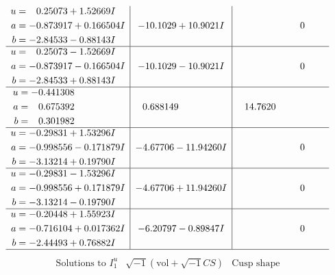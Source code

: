 \documentclass[1p]{elsarticle_modified}
\theoremstyle{definition}
\newcommand{\I}{\sqrt{-1}}
\begin{document}
$$\begin{array}{c|c|c}
\begin{aligned}
u &= \phantom{-}0.25073 + 1.52669 I \\
a &= -0.873917 + 0.166504 I \\
b &= -2.84533 - 0.88143 I\end{aligned}
 & -10.1029 + 10.9021 I & \phantom{-0.000000 } 0 \\ \hline\begin{aligned}
u &= \phantom{-}0.25073 - 1.52669 I \\
a &= -0.873917 - 0.166504 I \\
b &= -2.84533 + 0.88143 I\end{aligned}
 & -10.1029 - 10.9021 I & \phantom{-0.000000 } 0 \\ \hline\begin{aligned}
u &= -0.441308\phantom{ +0.000000I} \\
a &= \phantom{-}0.675392\phantom{ +0.000000I} \\
b &= \phantom{-}0.301982\phantom{ +0.000000I}\end{aligned}
 & \phantom{-}0.688149\phantom{ +0.000000I} & \phantom{-}14.7620\phantom{ +0.000000I} \\ \hline\begin{aligned}
u &= -0.29831 + 1.53296 I \\
a &= -0.998556 - 0.171879 I \\
b &= -3.13214 + 0.19790 I\end{aligned}
 & -4.67706 - 11.94260 I & \phantom{-0.000000 } 0 \\ \hline\begin{aligned}
u &= -0.29831 - 1.53296 I \\
a &= -0.998556 + 0.171879 I \\
b &= -3.13214 - 0.19790 I\end{aligned}
 & -4.67706 + 11.94260 I & \phantom{-0.000000 } 0 \\ \hline\begin{aligned}
u &= -0.20448 + 1.55923 I \\
a &= -0.716104 + 0.017362 I \\
b &= -2.44493 + 0.76882 I\end{aligned}
 & -6.20797 - 0.89847 I & \phantom{-0.000000 } 0\\
 \hline 
 \end{array}$$\newpage$$\begin{array}{c|c|c}  
\text{Solutions to }I^u_{1}& \I (\text{vol} + \sqrt{-1}CS) & \text{Cusp shape}\\
 \hline 
\begin{aligned}

\end{aligned}
\end{array}$$
\end{document}
